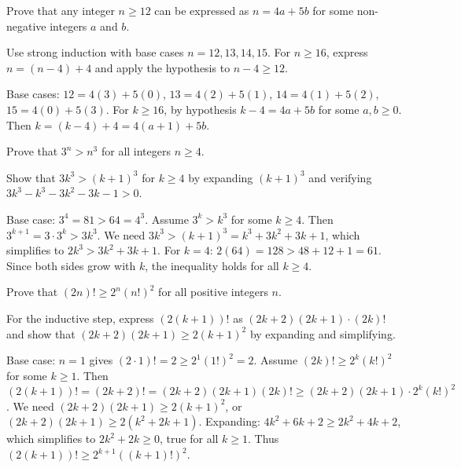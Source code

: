 \begin{problem}
Prove that any integer $n \ge 12$ can be expressed as $n = 4a + 5b$ for some non-negative integers $a$ and $b$.
\end{problem}

\begin{hint}
Use strong induction with base cases $n=12,13,14,15$. For $n \ge 16$, express $n = (n-4) + 4$ and apply the hypothesis to $n-4 \ge 12$.
\end{hint}

\begin{solution}[Sketch]
Base cases: $12 = 4(3) + 5(0)$, $13 = 4(2) + 5(1)$, $14 = 4(1) + 5(2)$, $15 = 4(0) + 5(3)$. For $k \ge 16$, by hypothesis $k-4 = 4a + 5b$ for some $a,b \ge 0$. Then $k = (k-4) + 4 = 4(a+1) + 5b$.
\end{solution}

\begin{problem}[Inequality $3^n > n^3$]
Prove that $3^n > n^3$ for all integers $n \ge 4$.
\end{problem}

\begin{hint}
Show that $3k^3 > (k+1)^3$ for $k \ge 4$ by expanding $(k+1)^3$ and verifying $3k^3 - k^3 - 3k^2 - 3k - 1 > 0$.
\end{hint}

\begin{solution}[Sketch]
Base case: $3^4 = 81 > 64 = 4^3$. Assume $3^k > k^3$ for some $k \ge 4$. Then $3^{k+1} = 3 \cdot 3^k > 3k^3$. We need $3k^3 > (k+1)^3 = k^3 + 3k^2 + 3k + 1$, which simplifies to $2k^3 > 3k^2 + 3k + 1$. For $k=4$: $2(64) = 128 > 48+12+1 = 61$. Since both sides grow with $k$, the inequality holds for all $k \ge 4$.
\end{solution}

\begin{problem}
Prove that $(2n)! \ge 2^n (n!)^2$ for all positive integers $n$.
\end{problem}

\begin{hint}
For the inductive step, express $(2(k+1))!$ as $(2k+2)(2k+1) \cdot (2k)!$ and show that $(2k+2)(2k+1) \ge 2(k+1)^2$ by expanding and simplifying.
\end{hint}

\begin{solution}[Sketch]
Base case: $n=1$ gives $(2 \cdot 1)! = 2 \ge 2^1(1!)^2 = 2$. Assume $(2k)! \ge 2^k(k!)^2$ for some $k \ge 1$. Then $(2(k+1))! = (2k+2)! = (2k+2)(2k+1)(2k)! \ge (2k+2)(2k+1) \cdot 2^k(k!)^2$. We need $(2k+2)(2k+1) \ge 2(k+1)^2$, or $(2k+2)(2k+1) \ge 2(k^2+2k+1)$. Expanding: $4k^2+6k+2 \ge 2k^2+4k+2$, which simplifies to $2k^2+2k \ge 0$, true for all $k \ge 1$. Thus $(2(k+1))! \ge 2^{k+1}((k+1)!)^2$.
\end{solution}

